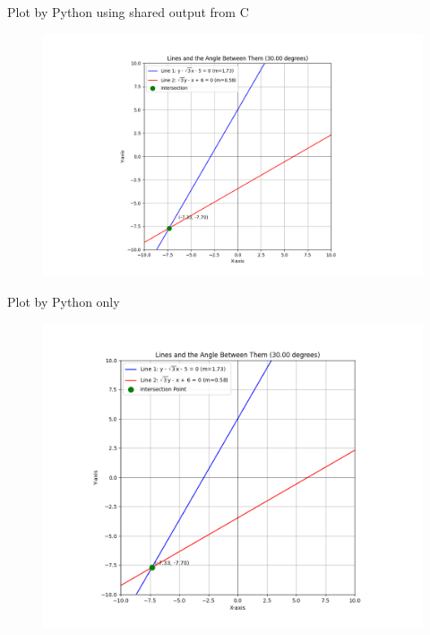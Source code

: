 \documentclass{beamer}
\begin{document}
\begin{frame}{Plot by Python using shared output from C}
\begin{figure}[H]
        \centering
        \includegraphics[width=1.0\columnwidth]{../figs/fig1.png}
        \caption{}
        \label{fig:1}
    \end{figure}
\end{frame}

 \begin{frame}{Plot by Python only}
\begin{figure}[H]
        \centering
        \includegraphics[width=1.0\columnwidth]{../figs/fig2.png}
        \caption{}
        \label{fig:2}
    \end{figure}
\end{frame}
\end{document}
